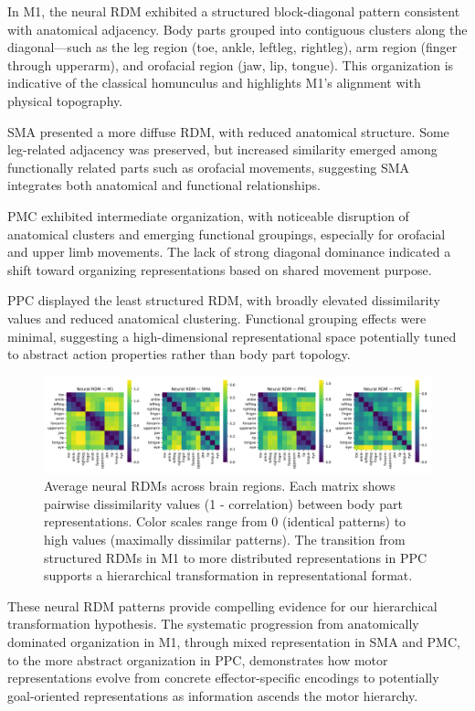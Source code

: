 \documentclass{article}
\begin{document}
In M1, the neural RDM exhibited a structured block-diagonal pattern consistent with anatomical adjacency. Body parts grouped into contiguous clusters along the diagonal—such as the leg region (toe, ankle, leftleg, rightleg), arm region (finger through upperarm), and orofacial region (jaw, lip, tongue). This organization is indicative of the classical homunculus and highlights M1's alignment with physical topography.

SMA presented a more diffuse RDM, with reduced anatomical structure. Some leg-related adjacency was preserved, but increased similarity emerged among functionally related parts such as orofacial movements, suggesting SMA integrates both anatomical and functional relationships.

PMC exhibited intermediate organization, with noticeable disruption of anatomical clusters and emerging functional groupings, especially for orofacial and upper limb movements. The lack of strong diagonal dominance indicated a shift toward organizing representations based on shared movement purpose.

PPC displayed the least structured RDM, with broadly elevated dissimilarity values and reduced anatomical clustering. Functional grouping effects were minimal, suggesting a high-dimensional representational space potentially tuned to abstract action properties rather than body part topology.

\begin{figure}[!htbp] 
\centering 
\includegraphics[width=\textwidth]{results/average_neural_rdms.png} 
\caption{Average neural RDMs across brain regions. Each matrix shows pairwise dissimilarity values (1 - correlation) between body part representations. Color scales range from 0 (identical patterns) to high values (maximally dissimilar patterns). The transition from structured RDMs in M1 to more distributed representations in PPC supports a hierarchical transformation in representational format.} 
\label{fig:neural_rdms} 
\end{figure}

These neural RDM patterns provide compelling evidence for our hierarchical transformation hypothesis. The systematic progression from anatomically dominated organization in M1, through mixed representation in SMA and PMC, to the more abstract organization in PPC, demonstrates how motor representations evolve from concrete effector-specific encodings to potentially goal-oriented representations as information ascends the motor hierarchy.
\end{document}
